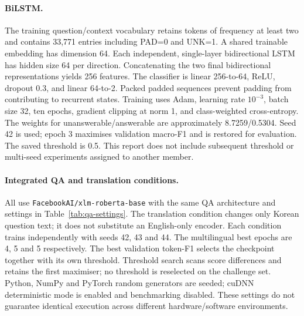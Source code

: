 \documentclass[11pt]{article}
\begin{document}
\paragraph{BiLSTM.}
The training question/context vocabulary retains tokens of frequency at least two and contains 33,771 entries including PAD=0 and UNK=1. A shared trainable embedding has dimension 64. Each independent, single-layer bidirectional LSTM has hidden size 64 per direction. Concatenating the two final bidirectional representations yields 256 features. The classifier is linear 256-to-64, ReLU, dropout 0.3, and linear 64-to-2. Packed padded sequences prevent padding from contributing to recurrent states. Training uses Adam, learning rate $10^{-3}$, batch size 32, ten epochs, gradient clipping at norm 1, and class-weighted cross-entropy. The weights for unanswerable/answerable are approximately 8.7259/0.5304. Seed 42 is used; epoch 3 maximises validation macro-F1 and is restored for evaluation. The saved threshold is 0.5. This report does not include subsequent threshold or multi-seed experiments assigned to another member.

\paragraph{Integrated QA and translation conditions.}
All use \texttt{FacebookAI/xlm-roberta-base} with the same QA architecture and settings in Table~\ref{tab:qa-settings}. The translation condition changes only Korean question text; it does not substitute an English-only encoder. Each condition trains independently with seeds 42, 43 and 44. The multilingual best epochs are 4, 5 and 5 respectively. The best validation token-F1 selects the checkpoint together with its own threshold. Threshold search scans score differences and retains the first maximiser; no threshold is reselected on the challenge set. Python, NumPy and PyTorch random generators are seeded; cuDNN deterministic mode is enabled and benchmarking disabled. These settings do not guarantee identical execution across different hardware/software environments.
\end{document}
